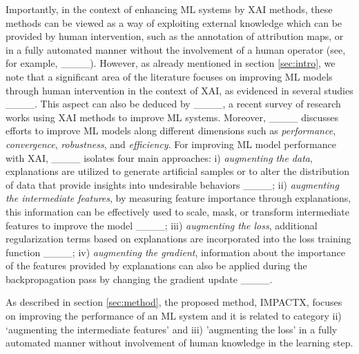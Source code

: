 Importantly, in the context of enhancing ML systems
by XAI methods, these methods can be viewed as a way of exploiting external knowledge which can be provided by human intervention, such as the annotation of  attribution maps, or in a fully automated manner without the involvement of a human operator (see, for example, ____).
However, as already mentioned in section \ref{sec:intro}, we note that a significant area of the literature focuses on improving ML models through human intervention in the context of XAI, as evidenced in several studies ____.
This aspect can also be deduced by ____, a recent survey of research works using XAI methods to improve ML systems. Moreover, ____ discusses efforts to improve ML models along different dimensions such as \textit{performance}, \textit{convergence}, \textit{robustness}, and \textit{efficiency}. For improving ML model performance with XAI, ____ isolates four main approaches: %
i) \textit{augmenting the data}, explanations are utilized to generate artificial samples or to alter the distribution of data that provide insights into undesirable behaviors ____; 
ii) \textit{augmenting the intermediate features}, by measuring feature importance through explanations, this information can be effectively used to scale, mask, or transform intermediate features to improve the model ____;
iii) \textit{augmenting the loss}, additional regularization terms based on explanations are incorporated into the loss training function ____; 
iv) \textit{augmenting the gradient}, information about the importance of the features provided by explanations can also be applied during the backpropagation pass by changing the gradient update ____.
%

As described in section \ref{sec:method}, the proposed method, IMPACTX, focuses on improving the performance of an ML system and it is related to category ii) ‘augmenting the intermediate features’ and iii) 'augmenting the loss' in a fully automated manner without involvement of human knowledge in the learning step. 

